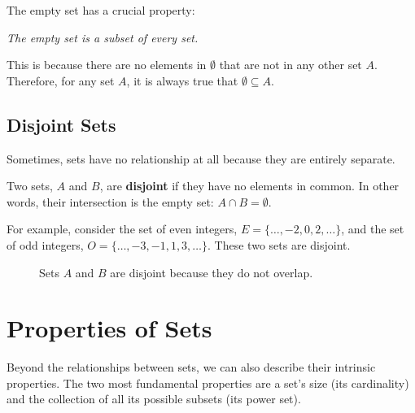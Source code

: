 The empty set has a crucial property:
\begin{center}
    \textit{The empty set is a subset of every set.}
\end{center}
This is because there are no elements in $\emptyset$ that are not in any other set $A$. Therefore, for any set $A$, it is always true that $\emptyset \subseteq A$.

\subsection*{Disjoint Sets}
Sometimes, sets have no relationship at all because they are entirely separate.

\begin{definition}
    Two sets, $A$ and $B$, are \textbf{disjoint} if they have no elements in common. In other words, their intersection is the empty set: $A \cap B = \emptyset$.
\end{definition}

For example, consider the set of even integers, $E = \{\dots, -2, 0, 2, \dots\}$, and the set of odd integers, $O = \{\dots, -3, -1, 1, 3, \dots\}$. These two sets are disjoint.

\begin{figure}[htbp]
    \centering
    \caption{Sets $A$ and $B$ are disjoint because they do not overlap.}
    \label{fig:disjoint_sets}
\end{figure}

\section{Properties of Sets}
Beyond the relationships between sets, we can also describe their intrinsic properties. The two most fundamental properties are a set's size (its cardinality) and the collection of all its possible subsets (its power set).

